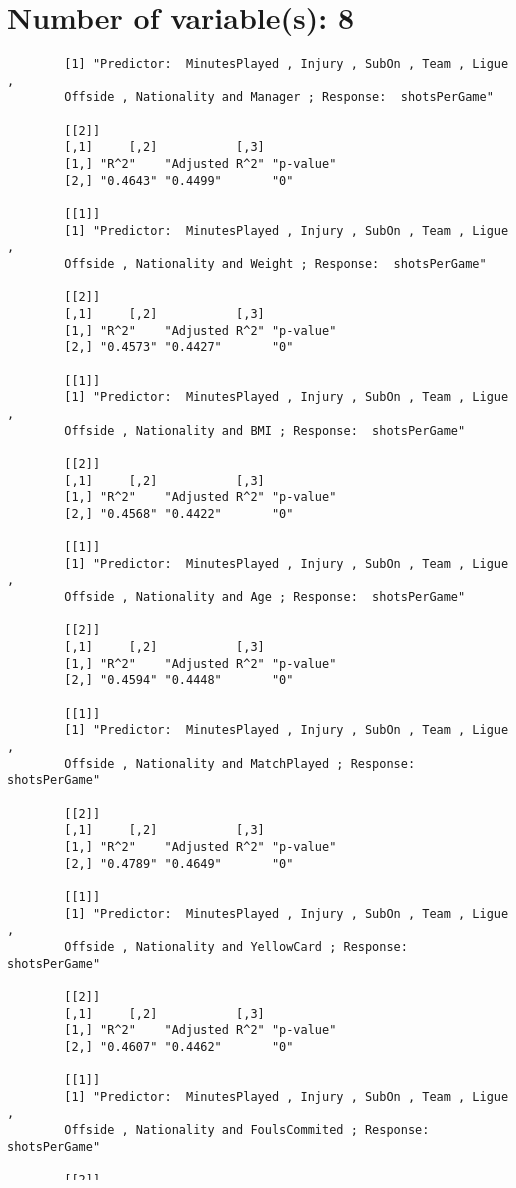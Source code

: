 \documentclass[12pt]{article}
\begin{document}
	\section{Number of variable(s): 8}
	\begin{verbatim}
		[1] "Predictor:  MinutesPlayed , Injury , SubOn , Team , Ligue , 
		Offside , Nationality and Manager ; Response:  shotsPerGame"
		
		[[2]]
		[,1]     [,2]           [,3]     
		[1,] "R^2"    "Adjusted R^2" "p-value"
		[2,] "0.4643" "0.4499"       "0"      
		
		[[1]]
		[1] "Predictor:  MinutesPlayed , Injury , SubOn , Team , Ligue , 
		Offside , Nationality and Weight ; Response:  shotsPerGame"
		
		[[2]]
		[,1]     [,2]           [,3]     
		[1,] "R^2"    "Adjusted R^2" "p-value"
		[2,] "0.4573" "0.4427"       "0"      
		
		[[1]]
		[1] "Predictor:  MinutesPlayed , Injury , SubOn , Team , Ligue , 
		Offside , Nationality and BMI ; Response:  shotsPerGame"
		
		[[2]]
		[,1]     [,2]           [,3]     
		[1,] "R^2"    "Adjusted R^2" "p-value"
		[2,] "0.4568" "0.4422"       "0"      
		
		[[1]]
		[1] "Predictor:  MinutesPlayed , Injury , SubOn , Team , Ligue , 
		Offside , Nationality and Age ; Response:  shotsPerGame"
		
		[[2]]
		[,1]     [,2]           [,3]     
		[1,] "R^2"    "Adjusted R^2" "p-value"
		[2,] "0.4594" "0.4448"       "0"      
		
		[[1]]
		[1] "Predictor:  MinutesPlayed , Injury , SubOn , Team , Ligue , 
		Offside , Nationality and MatchPlayed ; Response:  shotsPerGame"
		
		[[2]]
		[,1]     [,2]           [,3]     
		[1,] "R^2"    "Adjusted R^2" "p-value"
		[2,] "0.4789" "0.4649"       "0"      
		
		[[1]]
		[1] "Predictor:  MinutesPlayed , Injury , SubOn , Team , Ligue , 
		Offside , Nationality and YellowCard ; Response:  shotsPerGame"
		
		[[2]]
		[,1]     [,2]           [,3]     
		[1,] "R^2"    "Adjusted R^2" "p-value"
		[2,] "0.4607" "0.4462"       "0"      
		
		[[1]]
		[1] "Predictor:  MinutesPlayed , Injury , SubOn , Team , Ligue , 
		Offside , Nationality and FoulsCommited ; Response:  shotsPerGame"
		
		[[2]]
		[,1]     [,2]           [,3]     
		[1,] "R^2"    "Adjusted R^2" "p-value"
		[2,] "0.4569" "0.4424"       "0"      
		
	\end{verbatim}
		Highest Ajusted $ R^2 $ is 0.4499 corresponding to $ MinutesPlayed $, $ Injury $, $ SubOn $, $ Team $, $ Ligue $, $ Offside $, $ Nationality $ and $ Manager $.
	
\end{document}
